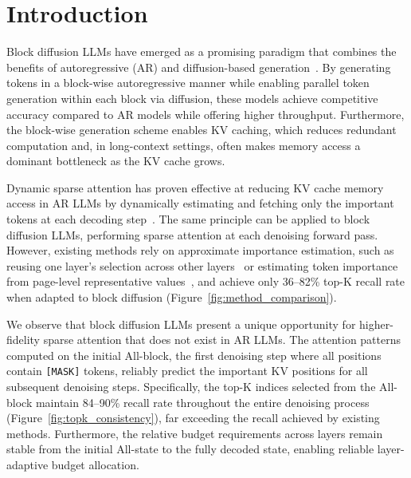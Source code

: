\section{Introduction}
\label{sec:introduction}

Block diffusion LLMs have emerged as a promising paradigm that combines the benefits of autoregressive (AR) and diffusion-based generation~\citep{arriola2025blockdiffusion, wu2025fastdllmv2, cheng2025sdar}. By generating tokens in a block-wise autoregressive manner while enabling parallel token generation within each block via diffusion, these models achieve competitive accuracy compared to AR models while offering higher throughput. Furthermore, the block-wise generation scheme enables KV caching, which reduces redundant computation and, in long-context settings, often makes memory access a dominant bottleneck as the KV cache grows.

Dynamic sparse attention has proven effective at reducing KV cache memory access in AR LLMs by dynamically estimating and fetching only the important tokens at each decoding step~\citep{tang2024quest, yang2025tidaldecode}. The same principle can be applied to block diffusion LLMs, performing sparse attention at each denoising forward pass. However, existing methods rely on approximate importance estimation, such as reusing one layer's selection across other layers~\citep{yang2025tidaldecode} or estimating token importance from page-level representative values~\citep{tang2024quest}, and achieve only 36--82\% top-K recall rate when adapted to block diffusion (Figure~\ref{fig:method_comparison}).

We observe that block diffusion LLMs present a unique opportunity for higher-fidelity sparse attention that does not exist in AR LLMs. The attention patterns computed on the initial All-\mask block, the first denoising step where all positions contain \texttt{[MASK]} tokens, reliably predict the important KV positions for all subsequent denoising steps. Specifically, the top-K indices selected from the All-\mask block maintain 84--90\% recall rate throughout the entire denoising process (Figure~\ref{fig:topk_consistency}), far exceeding the recall achieved by existing methods. Furthermore, the relative budget requirements across layers remain stable from the initial All-\mask state to the fully decoded state, enabling reliable layer-adaptive budget allocation.

